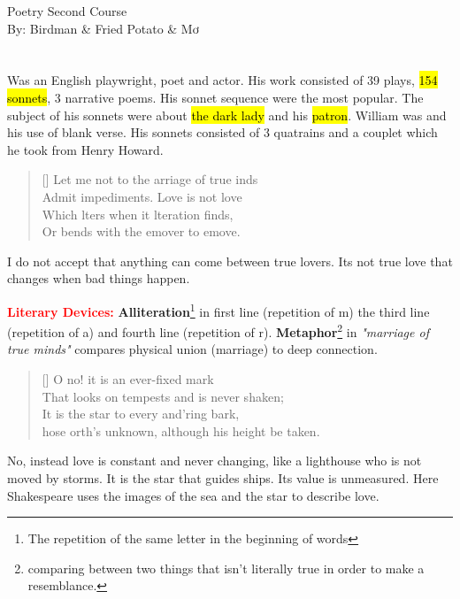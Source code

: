 \documentclass[12pt, a4paper]{article}
\begin{document}
{\fonthead
\begin{center}
\huge{Poetry Second Course}\\[0.5cm]
\Large{By: Birdman \& Fried Potato \& Mơ}\\[1cm]
\end{center}
}

\section*{}
Was an English playwright, poet and actor. His work consisted
of 39 plays, \hl{154 sonnets}, 3 narrative poems. His sonnet sequence were
the most popular. The subject of his sonnets were about \hl{the dark lady} and his \hl{patron}.
William was  and his use of blank verse. His 
sonnets consisted of 3 quatrains and a couplet which he 
took from Henry Howard.


\settowidth{\versewidth}{let me not to the marriage of true minds}
\begin{verse}[\versewidth]
{\fontverse
Let me not to the arriage of true inds\\
Admit impediments. Love is not love \\
Which lters when it lteration finds,\\ 
Or bends with the emover to emove.
}
\end{verse}
I do not accept that anything can come between 
true lovers. Its not true love that changes when bad things
happen.\medbreak

\textbf{\textcolor{red}{Literary Devices:}} \textbf{Alliteration}\footnote{
The repetition of the same letter in the beginning of words} 
in first line (repetition of m) the third line (repetition of a) and 
fourth line (repetition of r).  \textbf{Metaphor}\footnote{ comparing between
two things that isn't literally true in order to make a resemblance.}  
in \textit{"marriage of true minds"} compares physical union 
(marriage) to deep connection.

\begin{verse}[\versewidth]
{\fontverse
O no! it is an ever-fixed mark\\
That looks on tempests and is never shaken;\\
It is the star to every and'ring bark,\\
hose orth's unknown, although his height be taken.
}
\end{verse}
No, instead love is constant and never changing,
like a lighthouse who is not moved by storms.
It is the star that guides ships. Its value 
is unmeasured. Here Shakespeare uses the images of the 
sea and the star to describe love.\medbreak
\end{document}
